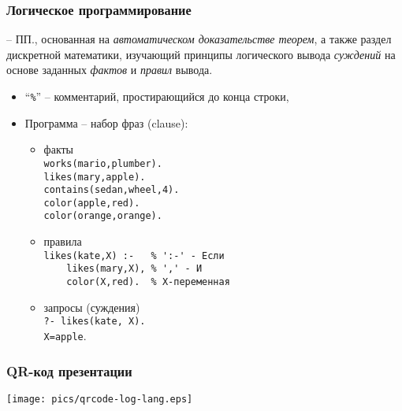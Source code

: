 \documentclass[10pt]{beamer}
\begin{document}
\begin{frame}[fragile]
  \frametitle{Логическое программирование}
  -- ПП., основанная на \emph{автоматическом доказательстве теорем}, а также раздел дискретной математики, изучающий принципы логического вывода \emph{суждений} на основе заданных \emph{фактов} и \emph{правил} вывода.
  \begin{itemize}
  \item ``\verb|%|'' -- комментарий, простирающийся до конца строки,
  \item Программа -- набор фраз (clause):
    \begin{itemize}
    \item факты \\ \verb|works(mario,plumber).|\\\verb|likes(mary,apple).|\\ \verb|contains(sedan,wheel,4).|\\
      \verb|color(apple,red).|\\
      \verb|color(orange,orange).|
    \item правила \\ \verb|likes(kate,X) :-   % ':-' - Если |\\
      \verb|    likes(mary,X), % ',' - И |\\
      \verb|    color(X,red).  % X-переменная|
    \item запросы (суждения) \\ \verb|?- likes(kate, X).|\\\verb|X=apple|.
    \end{itemize}
  \end{itemize}
\end{frame}

\begin{frame}
  \frametitle{QR-код презентации}
  \centering
  \texttt{[image: pics/qrcode-log-lang.eps]}
\end{frame}
\end{document}

